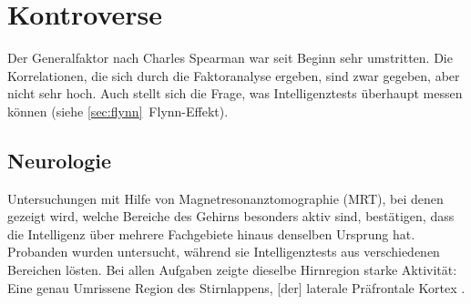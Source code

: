 \cite{wiki_intheorie}

\section{Kontroverse}
Der Generalfaktor nach Charles Spearman war seit Beginn sehr umstritten. Die Korrelationen, die sich durch die Faktoranalyse ergeben, sind zwar gegeben, aber nicht sehr hoch. Auch stellt sich die Frage, was Intelligenztests überhaupt messen können (siehe \ref{sec:flynn}~Flynn-Effekt).


\subsection{Neurologie}
Untersuchungen mit Hilfe von Magnetresonanztomographie (MRT), bei denen gezeigt wird, welche Bereiche des Gehirns besonders aktiv sind, bestätigen, dass die Intelligenz über mehrere Fachgebiete hinaus denselben Ursprung hat.
Probanden wurden untersucht, während sie Intelligenztests aus verschiedenen Bereichen lösten. Bei allen Aufgaben zeigte dieselbe Hirnregion starke Aktivität: Eine \glqq genau Umrissene Region des Stirnlappens, [der] laterale Präfrontale Kortex \grqq{} \cite{geok15}.
